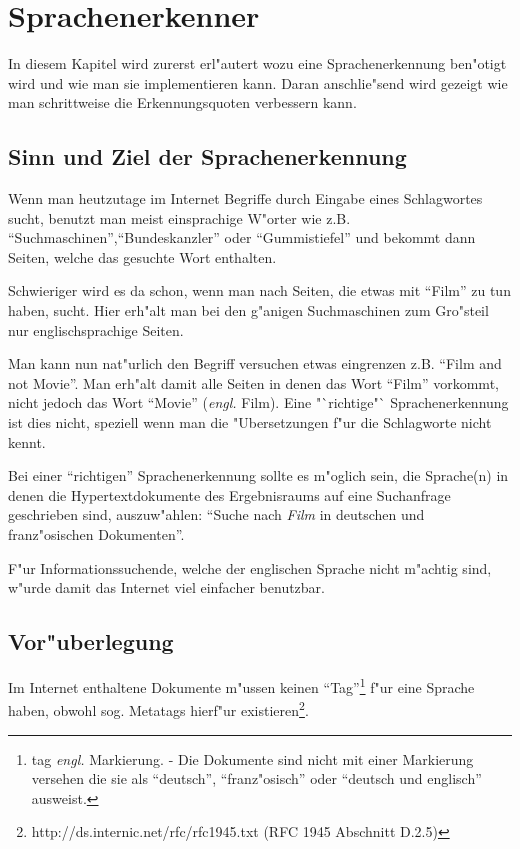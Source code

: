 \chapter{Sprachenerkenner}

In diesem Kapitel wird zurerst erl"autert wozu eine Sprachenerkennung ben"otigt wird und wie man sie implementieren kann. Daran anschlie"send wird gezeigt wie man schrittweise die Erkennungsquoten verbessern kann.

\section{Sinn und Ziel der Sprachenerkennung}

Wenn man heutzutage im Internet Begriffe durch Eingabe eines Schlagwortes sucht, benutzt man meist einsprachige W"orter wie z.B. "`Suchmaschinen"',"`Bundeskanzler"' oder "`Gummistiefel"' und bekommt dann Seiten, welche das gesuchte Wort enthalten.

Schwieriger wird es da schon, wenn man nach Seiten, die etwas mit "`Film"' zu tun haben, sucht. Hier erh"alt man bei den g"anigen Suchmaschinen zum Gro"steil nur englischsprachige Seiten. 

Man kann nun nat"urlich den Begriff versuchen etwas eingrenzen z.B. "`Film and not Movie"'. Man erh"alt damit alle Seiten in denen das Wort "`Film"' vorkommt, nicht jedoch das Wort "`Movie"' ({\em engl.} Film). Eine "`richtige"` Sprachenerkennung ist dies nicht, speziell wenn man die "Ubersetzungen f"ur die Schlagworte nicht kennt.

Bei einer "`richtigen"' Sprachenerkennung sollte es m"oglich sein, die Sprache(n) in denen die Hypertextdokumente des Ergebnisraums auf eine Suchanfrage geschrieben sind, auszuw"ahlen: "`Suche nach {\em Film} in deutschen und franz"osischen Dokumenten"'.

F"ur Informationssuchende, welche der englischen Sprache nicht m"achtig sind, w"urde damit das Internet viel einfacher benutzbar.


\section{Vor"uberlegung}
Im Internet enthaltene Dokumente m"ussen keinen "`Tag"'\footnote{tag {\em engl.} Markierung. - Die Dokumente sind nicht mit einer Markierung versehen die sie als "`deutsch"', "`franz"osisch"' oder "`deutsch und englisch"' ausweist.} f"ur eine Sprache haben, obwohl sog. Metatags hierf"ur existieren\footnote{http://ds.internic.net/rfc/rfc1945.txt  (RFC 1945 Abschnitt D.2.5)}.

